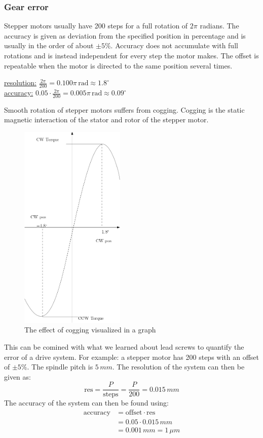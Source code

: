 \documentclass[11pt, a4paper]{article}
\newcommand*{\rad}{\ensuremath{\,\text{rad}}}
\numberwithin{equation}{section}
\numberwithin{figure}{section}
\begin{document}
\subsubsection{Gear error}
Stepper motors usually have 200 steps for a full rotation of $2\pi$ radians. The accuracy is given as deviation from the specified position in percentage and is usually in the order of about $\pm 5\%$. Accuracy does not accumulate with full rotations and is instead independent for every step the motor makes. The offset is repeatable when the motor is directed to the same position several times.
\begin{center}
  \underline{resolution:} $\frac{2\pi}{200} = 0.100 \pi \rad \approx 1.8^\circ$\\
  \underline{accuracy:} $0.05\cdot\frac{2\pi}{200} = 0.005\pi \rad \approx 0.09^\circ$ 
\end{center}
Smooth rotation of stepper motors suffers from cogging. Cogging is the static magnetic interaction of the stator and rotor of the stepper motor.
\begin{figure}[h]
  \centerline{\includegraphics[width=50mm]{images/Stepper.png}}
  \caption{The effect of cogging visualized in a graph}
\end{figure}
This can be comined with what we learned about lead screws to quantify the error of a drive system. For example: a stepper motor has 200 steps with an offset of $\pm 5\%$. The spindle pitch is $5\,mm$. The resolution of the system can then be given as:
\begin{equation}
  \text{res} = \frac{P}{\text{steps}} = \frac{P}{200} = 0.015\,mm
\end{equation}
The accuracy of the system can then be found using:
\begin{align}
  \text{accuracy} &= \text{offset}\cdot \text{res} \\
                  &= 0.05\cdot 0.015\,mm \\
                  &= 0.001\,mm = 1\,\mu m
\end{align}
\end{document}
